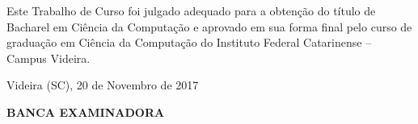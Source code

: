 \begin{folhadeaprovacao}

  \begin{center}
  \vspace*{-1.2cm}
    \textbf{\large\imprimirautor}
    
    \vspace*{\fill}\vspace*{\fill}\vspace*{\fill}
    \parbox{15cm}{
        \OnehalfSpacing\centering\large\textbf{\imprimirtitulo}
    }
    \vspace*{\fill}\vspace*{\fill}
    
    \hspace{.45\textwidth}
    \begin{minipage}{.5\textwidth}
        Este Trabalho de Curso foi julgado
        adequado para a obtenção do título de
        Bacharel em Ciência da Computação e
        aprovado em sua forma final pelo curso de
        graduação em Ciência da Computação do Instituto Federal Catarinense
        – Campus Videira. 

    \end{minipage}%
    \vspace*{\fill}
   \end{center}
    \vspace{-1cm}
  \begin{center}
  	 Videira (SC), 20 de Novembro de 2017
  \end{center}
  


  
   			  
    \begin{center}
  	\textbf{ BANCA EXAMINADORA}
   \end{center}
    

    \vspace*{1cm}
  
\end{folhadeaprovacao}